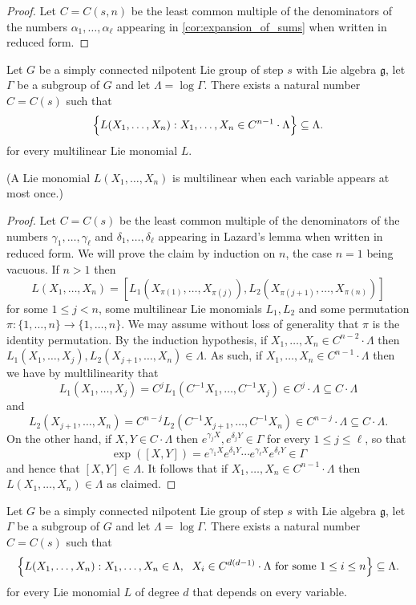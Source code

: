 \begin{proof}
Let $C=C(s,n)$ be the least common multiple of the denominators of the numbers $\alpha_1,\ldots,\alpha_\ell$ appearing in \cref{cor:expansion_of_sums} when written in reduced form.
\end{proof}

\begin{lemma}
\label{lem:multlilinear_monomials}
Let $G$ be a simply connected nilpotent Lie group of step $s$ with Lie algebra $\mathfrak{g}$, let $\Gamma$ be a subgroup of $G$ and let $\Lambda = \log \Gamma$. There exists a natural number $C=C(s)$ such that
\[
\Bigl\{L(X_1,\ldots,X_n) : X_1,\ldots,X_n \in C^{n-1} \cdot \Lambda \Bigr\} \subseteq \Lambda.
\]
for every multilinear Lie monomial $L$. 
\end{lemma}

(A Lie monomial $L(X_1,\ldots,X_n)$ is multilinear when each variable appears at most once.)

\begin{proof}
Let $C=C(s)$ be the least common multiple of the denominators of the numbers $\gamma_1,\ldots,\gamma_\ell$ and $\delta_1,\ldots,\delta_\ell$ appearing in Lazard's lemma when written in reduced form. We will prove the claim by induction on $n$, the case $n=1$ being vacuous. If $n>1$ then 
\[
L(X_1,\ldots,X_n)=[L_1(X_{\pi(1)},\ldots,X_{\pi(j)}),L_2(X_{\pi(j+1)},\ldots,X_{\pi(n)})] 
\]
for some $1\leq j < n$, some multilinear Lie monomials $L_1,L_2$ and some permutation $\pi:\{1,\ldots,n\}\to\{1,\ldots,n\}$. We may assume without loss of generality that $\pi$ is the identity permutation. By the induction hypothesis, if $X_1,\ldots,X_n\in C^{n-2} \cdot \Lambda$ then $L_1(X_1,\ldots,X_j),L_2(X_{j+1},\ldots,X_n)\in \Lambda$. As such, if $X_1,\ldots,X_n \in C^{n-1} \cdot \Lambda$ then we have by multlilinearity that
\[
L_1(X_1,\ldots,X_j)=C^jL_1(C^{-1}X_1,\ldots,C^{-1}X_j)\in C^{j} \cdot \Lambda \subseteq C \cdot \Lambda \] and  \[L_2(X_{j+1},\ldots,X_n)=C^{n-j}L_2(C^{-1}X_{j+1},\ldots,C^{-1}X_n)\in C^{n-j} \cdot \Lambda \subseteq C \cdot \Lambda.
\]
On the other hand, if $X,Y\in C\cdot \Lambda$ then $e^{\gamma_j X},e^{\delta_j Y} \in \Gamma$ for every $1\leq j \leq \ell$, so that
\[
\exp([X,Y])=e^{\gamma_1 X} e^{\delta_1 Y} \cdots e^{\gamma_\ell X} e^{ \delta_\ell Y} \in \Gamma
\]
and hence that $[X,Y] \in \Lambda$. It follows that if $X_1,\ldots,X_n \in C^{n-1} \cdot \Lambda$ then $L(X_1,\ldots,X_n)\in \Lambda$ as claimed.
\end{proof}

\begin{corollary}
\label{cor:multlilinear_monomials}
Let $G$ be a simply connected nilpotent Lie group of step $s$ with Lie algebra $\mathfrak{g}$, let $\Gamma$ be a subgroup of $G$ and let $\Lambda = \log \Gamma$. There exists a natural number $C=C(s)$ such that
\[
\Bigl\{L(X_1,\ldots,X_n) : X_1,\ldots,X_n \in \Lambda,\; \text{ $X_i\in C^{d(d-1)}\cdot \Lambda$ for some $1\leq i \leq n$} \Bigr\} \subseteq \Lambda.
\]
for every Lie monomial $L$ of degree $d$ that depends on every variable. 
\end{corollary}

